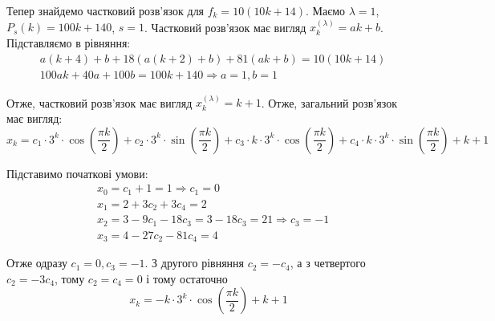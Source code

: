 \documentclass{hw_template}
\begin{document}
Тепер знайдемо частковий розв'язок для $f_k = 10(10k+14)$. Маємо $\lambda=1$, $P_s(k)=100k+140$, $s=1$. Частковий розв'язок має вигляд $x_k^{(\lambda)} = ak+b$. Підставляємо в рівняння:
\begin{align*}
    &a(k+4)+b + 18(a(k+2)+b) + 81(ak+b) = 10(10k+14) \\
    &100ak + 40a + 100b = 100k + 140 \Rightarrow a=1, b=1
\end{align*}

Отже, частковий розв'язок має вигляд $x_k^{(\lambda)} = k+1$. Отже, загальний розв'язок має вигляд:
\begin{equation*}
    x_k = c_1 \cdot 3^k \cdot \cos\left(\frac{\pi k}{2}\right) + c_2 \cdot 3^k \cdot \sin\left(\frac{\pi k}{2}\right) + c_3 \cdot k \cdot 3^k \cdot \cos\left(\frac{\pi k}{2}\right) + c_4 \cdot k \cdot 3^k \cdot \sin\left(\frac{\pi k}{2}\right) + k+1
\end{equation*}

Підставимо початкові умови:
\begin{align*}
    &x_0 = c_1 + 1 = 1 \Rightarrow c_1 = 0 \\
    &x_1 = 2 + 3c_2 + 3c_4 = 2 \\
    &x_2 = 3 - 9c_1 - 18c_3 = 3 - 18c_3 = 21 \Rightarrow c_3 = -1 \\
    &x_3 = 4 - 27c_2 - 81c_4 = 4
\end{align*}

Отже одразу $c_1=0,c_3=-1$. З другого рівняння $c_2=-c_4$, а з четвертого $c_2 = -3c_4$, тому $c_2=c_4=0$ і тому остаточно
\begin{equation*}
    \boxed{x_k = - k \cdot 3^k \cdot \cos\left(\frac{\pi k}{2}\right) + k + 1}
\end{equation*}
\end{document}
